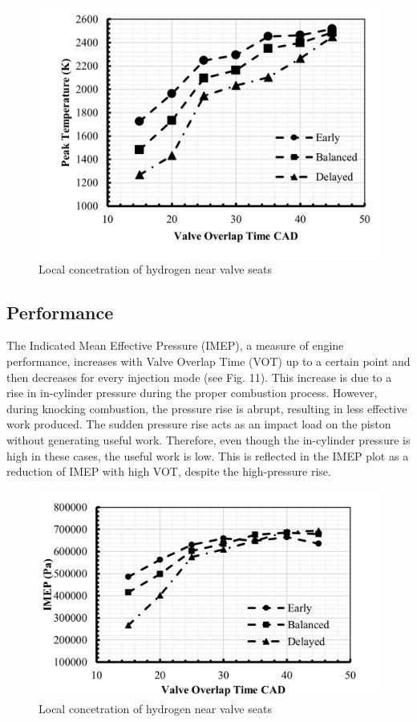 \documentclass[conference]{IEEEtran}
\begin{document}
\begin{figure}[htbp]
    \centerline{\includegraphics{plots and graphs/10.png}}
    \caption{Local concetration of hydrogen near valve seats}
    \label{plt_10}
    \end{figure}

\subsection{Performance}
The Indicated Mean Effective Pressure (IMEP), a measure of engine performance, increases with Valve Overlap Time (VOT) up to a certain point and then decreases for every injection mode (see Fig. 11). This increase is due to a rise in in-cylinder pressure during the proper combustion process. However, during knocking combustion, the pressure rise is abrupt, resulting in less effective work produced. The sudden pressure rise acts as an impact load on the piston without generating useful work. Therefore, even though the in-cylinder pressure is high in these cases, the useful work is low. This is reflected in the IMEP plot as a reduction of IMEP with high VOT, despite the high-pressure rise.

\begin{figure}[htbp]
    \centerline{\includegraphics{plots and graphs/11.png}}
    \caption{Local concetration of hydrogen near valve seats}
    \label{plt_11}
    \end{figure}
\end{document}
